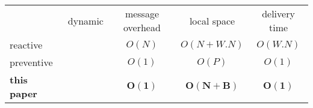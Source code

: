 \newcommand{\cmark}{\ding{51}}%
\newcommand{\xmark}{\ding{55}}%

\setlength{\tabcolsep}{3pt} %

\begin{tabularx}{0.98\columnwidth}{@{}Xcccc@{}}
  & dynamic & message overhead & local space &  delivery time \\ \cmidrule{2-5}
  reactive~\cite{schwarz1994detecting} & \cmark & $O(N)$ & $O(N+W.N)$ & $O(W.N)$ \\
  preventive~\cite{friedman2004causal} & \xmark & $O(1)$ & $O(P)$ & $O(1)$ \\ \hline\hline
  \textbf{this paper} & \textbf{\cmark} & $\mathbf{O(1)}$ & $\mathbf{O(N+B)}$ & $\mathbf{O(1)}$ \\ 
\end{tabularx}

